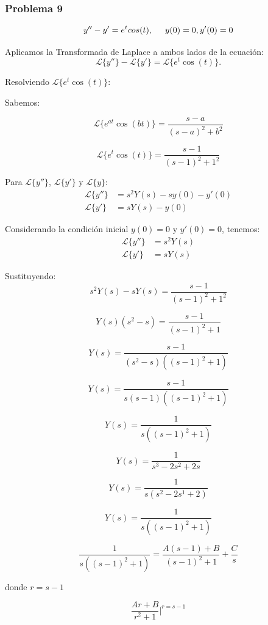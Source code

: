 \documentclass{article}
\begin{document}
\newpage


\subsubsection{Problema 9}

\[y'' - y' = e^{t}cos(t), \hspace{.5cm} y(0) = 0, y'(0) = 0 \]

Aplicamos la Transformada de Laplace a ambos lados de la ecuación:
\[
    \mathcal{L}\{y''\} - \mathcal{L}\{y'\} = \mathcal{L}\{e^t\cos(t)\}.
\]

Resolviendo $\mathcal{L}\{e^t\cos(t)\}$:

Sabemos:

\[
    \mathcal{L}\{e^{at}\cos(bt)\} = \frac{s-a}{(s-a)^2 + b^2}
\]

\[
    \mathcal{L}\{e^t\cos(t)\} = \frac{s-1}{(s-1)^2 + 1^2}
\]

Para \(\mathcal{L}\{y''\}\), \(\mathcal{L}\{y'\}\) y \(\mathcal{L}\{y\}\):
\begin{align*}
    \mathcal{L}\{y''\} & = s^2Y(s) - sy(0) - y'(0) \\
    \mathcal{L}\{y'\}  & = sY(s) - y(0)
\end{align*}

Considerando la condición inicial $y(0) = 0$ y $y'(0) = 0$, tenemos:
\begin{align*}
    \mathcal{L}\{y''\} & = s^2Y(s) \\
    \mathcal{L}\{y'\}  & = sY(s)
\end{align*}

Sustituyendo:
\[
    s^2Y(s) - sY(s) = \frac{s-1}{(s-1)^2 + 1^2}
\]

\[
    Y(s)(s^2 - s) = \frac{s-1}{(s-1)^2 + 1}
\]

\[
    Y(s) = \frac{s-1}{(s^2 - s)((s-1)^2 + 1)}
\]

\[
    Y(s) = \frac{s-1}{s(s - 1)((s-1)^2 + 1)}
\]

\[
    Y(s) = \frac{1}{s((s-1)^2 + 1)}
\]

\[
    Y(s) = \frac{1}{s^3 - 2s^2 + 2s}
\]

\[
    Y(s) = \frac{1}{s(s^2 - 2s^1 + 2)}
\]

\[
    Y(s) = \frac{1}{s((s-1)^2 + 1)}
\]

\[
    \frac{1}{s((s-1)^2 + 1)} = \frac{A(s-1) + B}{(s-1)^2 + 1} + \frac{C}{s}
\]

donde $r = s-1$

\[
    \frac{Ar + B}{r^2 + 1} |^{r=s-1}
\]
\end{document}
